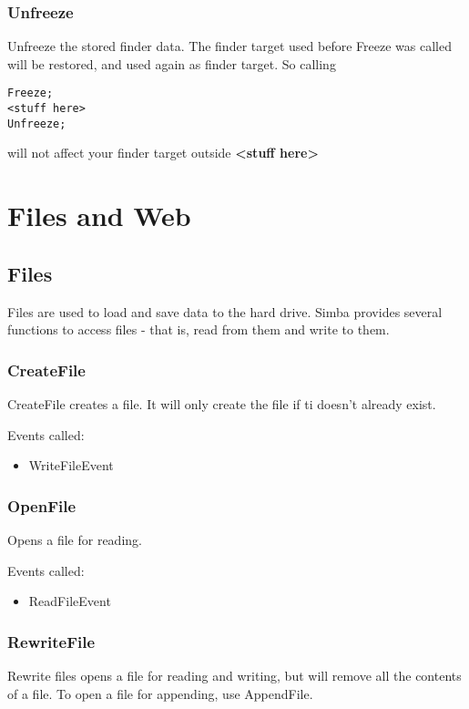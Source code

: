 \documentclass[a4paper]{report}
\begin{document}
\subsection{Unfreeze} 

Unfreeze the stored finder data. The finder target used before Freeze was called
will be restored, and used again as finder target. So calling
\begin{verbatim}
Freeze;
<stuff here>
Unfreeze;
\end{verbatim}
will not affect your finder target outside \textbf{<stuff here>}

\chapter{Files and Web}

\section{Files}

Files are used to load and save data to the hard drive.
Simba provides several functions to access files - that is, read
from them and write to them.

\subsection{CreateFile}

CreateFile creates a file. It will only create
the file if ti doesn't already exist.

Events called:
\begin{itemize}
\item WriteFileEvent
\end{itemize}

\subsection{OpenFile}

Opens a file for reading.

Events called:
\begin{itemize}
\item ReadFileEvent
\end{itemize}
\subsection{RewriteFile}

Rewrite files opens a file for reading and writing, but will remove all the
contents of a file. To open a file for appending, use AppendFile.
\end{document}
